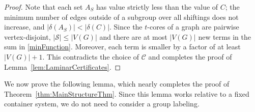 \documentclass[11pt]{article}
\theoremstyle{definition}
\begin{document}
\begin{proof}
    Note that each set $A_S$ has value strictly less than the value of $C$; the minimum number of edges outside of a subgroup over all shiftings does not increase, and $|\delta(A_S)|<|\delta(C)|$. Since the $t$-cores of a graph are pairwise vertex-disjoint, $|\mathcal{S}|\leq |V(G)|$ and there are at most $|V(G)|$ new terms in the sum in \eqref{minFunction}. Moreover, each term is smaller by a factor of at least $|V(G)| + 1$. This contradicts the choice of $\mathcal{C}$ and completes the proof of Lemma~\ref{lem:LaminarCertificates}.
\end{proof}

We now prove the following lemma, which nearly completes the proof of Theorem~\ref{thm:MainStructureThm}. Since this lemma works relative to a fixed container system, we do not need to consider a group labeling.

\end{document}
